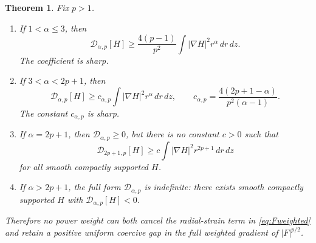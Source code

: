 \documentclass[11pt]{article}
\numberwithin{equation}{section}
\newtheorem{theorem}{Theorem}[section]
\theoremstyle{remark}
\begin{document}
\begin{theorem}\label{thm:phase}
Fix \(p>1\).
\begin{enumerate}[label=\textnormal{(\roman*)}]
\item If \(1<\alpha\le3\), then
\[
 \mathcal D_{\alpha,p}[H]
 \ge \frac{4(p-1)}{p^2}\int|\nabla H|^2r^\alpha\,dr\,dz.
\]
The coefficient is sharp.
\item If \(3<\alpha<2p+1\), then
\begin{equation}\label{eq:radgap}
 \mathcal D_{\alpha,p}[H]
 \ge c_{\alpha,p}\int|\nabla H|^2r^\alpha\,dr\,dz,
 \qquad
 c_{\alpha,p}=\frac{4(2p+1-\alpha)}{p^2(\alpha-1)}.
\end{equation}
The constant \(c_{\alpha,p}\) is sharp.
\item If \(\alpha=2p+1\), then \(\mathcal D_{\alpha,p}\ge0\), but there is no constant \(c>0\) such that
\[
 \mathcal D_{2p+1,p}[H]\ge c\int|\nabla H|^2r^{2p+1}\,dr\,dz
\]
for all smooth compactly supported \(H\).
\item If \(\alpha>2p+1\), the full form \(\mathcal D_{\alpha,p}\) is indefinite: there exists smooth compactly supported \(H\) with \(\mathcal D_{\alpha,p}[H]<0\).
\end{enumerate}
Therefore no power weight can both cancel the radial-strain term in \eqref{eq:Fweighted} and retain a positive uniform coercive gap in the full weighted gradient of \(|F|^{p/2}\).
\end{theorem}
\end{document}
